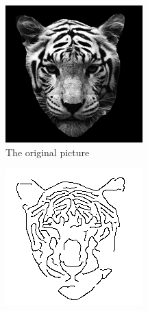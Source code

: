 \documentclass[10pt,final,journal]{IEEEtran}
\begin{document}
\begin{figure}[h!]
    \begin{subfigure}[b]{0.3\textwidth}
            \includegraphics[width=\textwidth]{tiger}
            \caption{The original picture}
            \label{fig:app_tiger}
    \end{subfigure}
    \begin{subfigure}[b]{0.3\textwidth}
            \includegraphics[width=\textwidth]{tiger_baseline}

\end{subfigure}
\end{figure}
\end{document}
